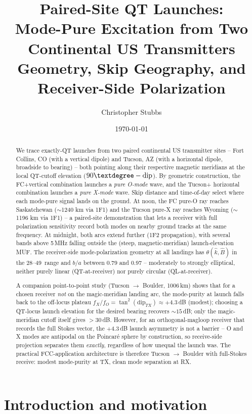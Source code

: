 \documentclass[11pt]{article}
\title{Paired-Site QT Launches: \\
       Mode-Pure Excitation from Two Continental US Transmitters\\
       \large Geometry, Skip Geography, and Receiver-Side Polarization}
\author{Christopher Stubbs}
\date{\today}
\begin{document}
\maketitle

\begin{abstract}
We trace exactly-QT launches from two paired continental US transmitter
sites -- Fort Collins, CO (with a vertical dipole) and Tucson, AZ (with
a horizontal dipole, broadside to bearing) -- both pointing along
their respective magnetic meridians at the local QT-cutoff elevation
($90\textdegree-\text{dip}$).  By geometric construction, the FC+vertical
combination launches a \emph{pure O-mode} wave, and the Tucson+
horizontal combination launches a \emph{pure X-mode} wave.  Skip
distance and time-of-day select where each mode-pure signal lands
on the ground.  At noon, the FC pure-O ray reaches Saskatchewan
($\sim$1240 km via 1F1) and the Tucson pure-X ray reaches Wyoming
($\sim$1196 km via 1F1) -- a paired-site demonstration that lets a
receiver with full polarization sensitivity record both modes on
nearby ground tracks at the same frequency.  At midnight, both arcs
extend further (1F2 propagation), with several bands above 5\,MHz
falling outside the (steep, magnetic-meridian) launch-elevation MUF.
The receiver-side mode-polarization geometry at all landings has
$\theta(\hat k, \hat B)$ in the 28--49\textdegree\ range and $b/a$
between 0.79 and 0.97 -- moderately to strongly elliptical, neither
purely linear (QT-at-receiver) nor purely circular (QL-at-receiver).

A companion point-to-point study (Tucson $\to$ Boulder, 1006\,km)
shows that for a chosen receiver \emph{not} on the magic-meridian
landing arc, the mode-purity at launch falls back to the off-locus
plateau $f_X/f_O = \tan^2(\mathrm{dip}_{TX})\approx +4.3\,$dB (modest);
choosing a QT-locus launch elevation for the desired bearing
recovers $\sim 15\,$dB; only the magic-meridian cutoff itself gives
$>30$\,dB.  However, for an orthogonal-magloop receiver that
records the full Stokes vector, the $+4.3$\,dB launch asymmetry is
not a barrier -- O and X modes are antipodal on the Poincar\'e
sphere by construction, so receive-side projection separates them
\emph{exactly}, regardless of how unequal the launch was.  The
practical FCC-application architecture is therefore Tucson $\to$
Boulder with full-Stokes receive: modest mode-purity at TX, clean
mode separation at RX.
\end{abstract}


\section{Introduction and motivation}
\end{document}

